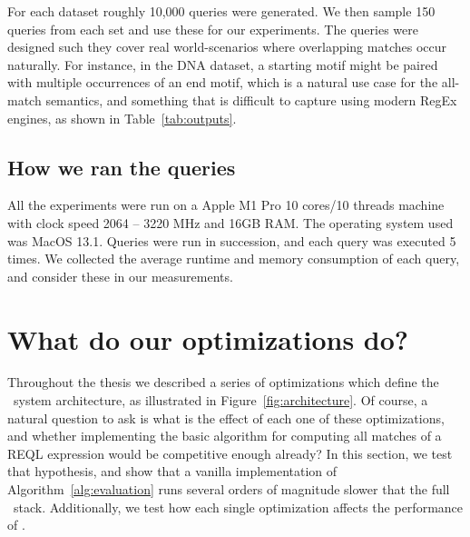 For each dataset roughly 10,000 queries were generated. We then sample 150
queries from each set and use these for our experiments. The queries were
designed such they cover real world-scenarios where overlapping matches occur
naturally. For instance, in the \textsf{DNA} dataset, a starting motif might be
paired with multiple occurrences of an end motif, which is a natural use case
for the all-match semantics, and something that is difficult to capture using
modern RegEx engines, as shown in Table~\ref{tab:outputs}. 


\subsection{How we ran the queries}
All the experiments were run on a Apple M1 Pro 10 cores/10 threads machine with
clock speed 2064 -- 3220 MHz and 16GB RAM. The operating system used was MacOS
13.1.   Queries were run in succession, and each query was executed 5 times. We
collected the average runtime and memory consumption of each query, and consider
these in our measurements.

\section{What do our optimizations do?}\label{ss:internal} Throughout the thesis
we described a series of optimizations which define the \rematch\ system
architecture, as illustrated in Figure~\ref{fig:architecture}. Of course, a
natural question to ask is what is the effect of each one of these
optimizations, and whether implementing the basic algorithm for computing all
matches of a REQL expression  would be competitive enough already? In this
section, we test that hypothesis, and show that a vanilla implementation of
Algorithm~\ref{alg:evaluation} runs several orders of magnitude slower that the
full \rematch\ stack. Additionally, we test how each single optimization affects
the performance of \rematch.




